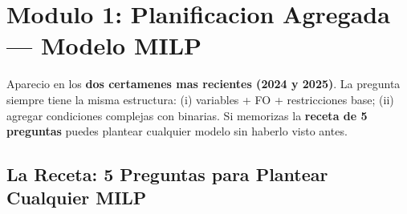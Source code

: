 \documentclass[11pt, a4paper]{article}
\begin{document}
\section[Modulo 1: Planificacion Agregada MILP]{Modulo 1: Planificacion Agregada --- Modelo MILP}

Aparecio en los \textbf{dos certamenes mas recientes (2024 y 2025)}.
La pregunta siempre tiene la misma estructura: (i) variables + FO + restricciones base;
(ii) agregar condiciones complejas con binarias. Si memorizas la \textbf{receta de 5 preguntas}
puedes plantear cualquier modelo sin haberlo visto antes.

\subsection{La Receta: 5 Preguntas para Plantear Cualquier MILP}
\end{document}
